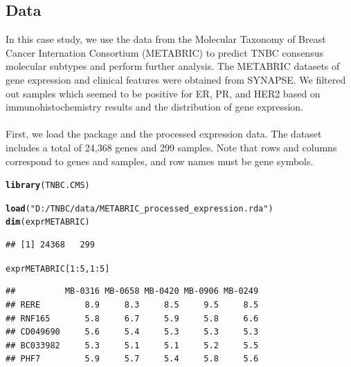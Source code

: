 \documentclass{article}\usepackage[]{graphicx}\usepackage[]{color}
\makeatletter
\newcommand{\hlnum}[1]{\textcolor[rgb]{0.686,0.059,0.569}{#1}}%
\newcommand{\hlstr}[1]{\textcolor[rgb]{0.192,0.494,0.8}{#1}}%
\newcommand{\hlopt}[1]{\textcolor[rgb]{0,0,0}{#1}}%
\newcommand{\hlstd}[1]{\textcolor[rgb]{0.345,0.345,0.345}{#1}}%
\newcommand{\hlkwd}[1]{\textcolor[rgb]{0.737,0.353,0.396}{\textbf{#1}}}%
\newenvironment{kframe}{%
 \def\at@end@of@kframe{}%
 \ifinner\ifhmode%
  \def\at@end@of@kframe{\end{minipage}}%
  \begin{minipage}{\columnwidth}%
 \fi\fi%
 \def\FrameCommand##1{\hskip\@totalleftmargin \hskip-\fboxsep
 \colorbox{shadecolor}{##1}\hskip-\fboxsep
     \hskip-\linewidth \hskip-\@totalleftmargin \hskip\columnwidth}%
 \MakeFramed {\advance\hsize-\width
   \@totalleftmargin\z@ \linewidth\hsize
   \@setminipage}}%
 {\par\unskip\endMakeFramed%
 \at@end@of@kframe}
\newenvironment{knitrout}{}{} %
\makeatother
\begin{document}
\subsection{Data}
In this case study, we use the data from the Molecular Taxonomy of Breast Cancer Internation Consortium (METABRIC) to predict TNBC consensus molecular subtypes and perform further analysis. The METABRIC datasets of gene expression and clinical features were obtained from SYNAPSE. We filtered out samples which seemed to be positive for ER, PR, and HER2 based on immunohistochemistry results and the distribution of gene expression.\paragraph{}
First, we load the package and the processed expression data. The dataset includes a total of 24,368 genes and 299 samples. Note that rows and columns correspond to genes and samples, and row names must be gene symbols.
\begin{knitrout}
\color{fgcolor}\begin{kframe}
\begin{alltt}
\hlkwd{library}\hlstd{(TNBC.CMS)}
\end{alltt}


{\ttfamily\noindent\itshape\color{messagecolor}{\#\# Loading required package: e1071}}

{\ttfamily\noindent\itshape\color{messagecolor}{\#\# Loading required package: quadprog}}\begin{alltt}
\hlkwd{load}\hlstd{(}\hlstr{"D:/TNBC/data/METABRIC_processed_expression.rda"}\hlstd{)}
\hlkwd{dim}\hlstd{(exprMETABRIC)}
\end{alltt}
\begin{verbatim}
## [1] 24368   299
\end{verbatim}
\begin{alltt}
\hlstd{exprMETABRIC[}\hlnum{1}\hlopt{:}\hlnum{5}\hlstd{,} \hlnum{1}\hlopt{:}\hlnum{5}\hlstd{]}
\end{alltt}
\begin{verbatim}
##          MB-0316 MB-0658 MB-0420 MB-0906 MB-0249
## RERE         8.9     8.3     8.5     9.5     8.5
## RNF165       5.8     6.7     5.9     5.8     6.6
## CD049690     5.6     5.4     5.3     5.3     5.3
## BC033982     5.3     5.1     5.1     5.2     5.5
## PHF7         5.9     5.7     5.4     5.8     5.6
\end{verbatim}
\end{kframe}
\end{knitrout}
\end{document}
